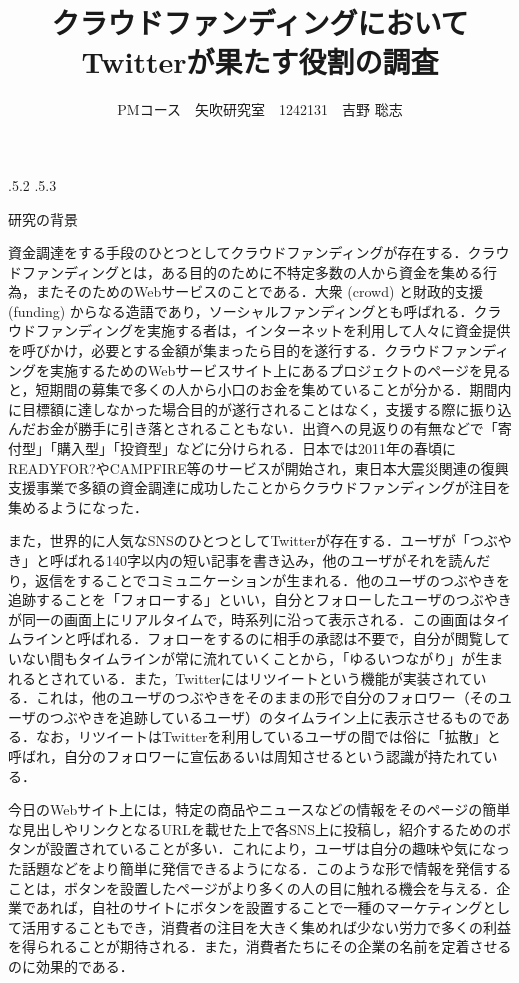 \documentclass[uplatex]{jsarticle}
\title{\vspace{-14mm}クラウドファンディングにおいてTwitterが果たす役割の調査}
\author{PMコース　矢吹研究室　1242131　吉野 聡志}
\date{}%
\makeatletter
\renewcommand{\section}{%
    \if@slide\clearpage\fi
    \@startsection{section}{1}{\z@}%
    {\Cvs \@plus.5\Cdp \@minus.2\Cdp}%
    {.5\Cvs \@plus.3\Cdp}%
    {\normalfont\raggedright}}
\makeatother
\begin{document}
\maketitle





\section{研究の背景}

資金調達をする手段のひとつとしてクラウドファンディングが存在する．クラウドファンディングとは，ある目的のために不特定多数の人から資金を集める行為，またそのためのWebサービスのことである．大衆 (crowd) と財政的支援 (funding) からなる造語であり，ソーシャルファンディングとも呼ばれる．クラウドファンディングを実施する者は，インターネットを利用して人々に資金提供を呼びかけ，必要とする金額が集まったら目的を遂行する．クラウドファンディングを実施するためのWebサービスサイト上にあるプロジェクトのページを見ると，短期間の募集で多くの人から小口のお金を集めていることが分かる．期間内に目標額に達しなかった場合目的が遂行されることはなく，支援する際に振り込んだお金が勝手に引き落とされることもない．出資への見返りの有無などで「寄付型」「購入型」「投資型」などに分けられる．日本では2011年の春頃にREADYFOR?やCAMPFIRE等のサービスが開始され，東日本大震災関連の復興支援事業で多額の資金調達に成功したことからクラウドファンディングが注目を集めるようになった．

また，世界的に人気なSNSのひとつとしてTwitterが存在する．ユーザが「つぶやき」と呼ばれる140字以内の短い記事を書き込み，他のユーザがそれを読んだり，返信をすることでコミュニケーションが生まれる．他のユーザのつぶやきを追跡することを「フォローする」といい，自分とフォローしたユーザのつぶやきが同一の画面上にリアルタイムで，時系列に沿って表示される．この画面はタイムラインと呼ばれる．フォローをするのに相手の承認は不要で，自分が閲覧していない間もタイムラインが常に流れていくことから，「ゆるいつながり」が生まれるとされている．また，Twitterにはリツイートという機能が実装されている．これは，他のユーザのつぶやきをそのままの形で自分のフォロワー（そのユーザのつぶやきを追跡しているユーザ）のタイムライン上に表示させるものである．なお，リツイートはTwitterを利用しているユーザの間では俗に「拡散」と呼ばれ，自分のフォロワーに宣伝あるいは周知させるという認識が持たれている．

今日のWebサイト上には，特定の商品やニュースなどの情報をそのページの簡単な見出しやリンクとなるURLを載せた上で各SNS上に投稿し，紹介するためのボタンが設置されていることが多い．これにより，ユーザは自分の趣味や気になった話題などをより簡単に発信できるようになる．このような形で情報を発信することは，ボタンを設置したページがより多くの人の目に触れる機会を与える．企業であれば，自社のサイトにボタンを設置することで一種のマーケティングとして活用することもでき，消費者の注目を大きく集めれば少ない労力で多くの利益を得られることが期待される．また，消費者たちにその企業の名前を定着させるのに効果的である．
\end{document}
